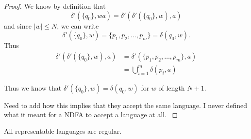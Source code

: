 \documentclass{bcthesis}
\renewcommand{\meo}{}
\begin{document}
\begin{proof}
		We know by definition that 
		\[
			\delta'(\{ q_0\}, wa) = \delta'( \delta'(\{ q_0\}, w), a )
		\]
		and since $|w| \leq N$, we can write 
		\[
			\delta'(\{ q_0 \}, w) = \{ p_1, p_2, \dots, p_m \} = \delta(q_0, w).
		\]
		Thus
		\begin{align*}
			\delta'( \delta'(\{ q_0 \}, w), a ) &= \delta'(\{ p_1, p_2, \dots, p_m \}, a) \\
			&= \bigcup_{i=1}^m \delta(p_i, a)
		\end{align*}

		Thus we know that $\delta'(\{ q_0 \}, w) = \delta(q_0, w)$ for $w$ of length $N+1$.

		\meo{
			Need to add how this implies that they accept the same language.
			I never defined what it meant for a NDFA to accept a language at all.
		}

	\end{proof}

	\begin{claim}
	\label{prop:representable_languages_regular}
		All representable languages are regular.
	\end{claim}
\end{document}
